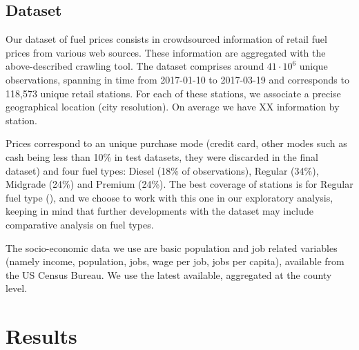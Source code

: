 \documentclass[3p,times,procedia]{elsarticle}
\begin{document}
\subsection{Dataset}


Our dataset of fuel prices consists in crowdsourced information of retail fuel prices from various web sources. These information are aggregated with the above-described crawling tool. The dataset comprises around $41\cdot 10^6$ unique observations, spanning in time from 2017-01-10 to 2017-03-19 and corresponds to 118,573 unique retail stations. For each of these stations, we associate a precise geographical location (city resolution). On average we have XX information by station. 



Prices correspond to an unique purchase mode (credit card, other modes such as cash being less than 10\% in test datasets, they were discarded in the final dataset) and four fuel types: Diesel (18\% of observations), Regular (34\%), Midgrade (24\%) and Premium (24\%). The best coverage of stations is for Regular fuel type (), and we choose to work with this one in our exploratory analysis, keeping in mind that further developments with the dataset may include comparative analysis on fuel types.




The socio-economic data we use are basic population and job related variables (namely income, population, jobs, wage per job, jobs per capita), available from the US Census Bureau. We use the latest available, aggregated at the county level.



\section{Results} \label{sec:result}
\end{document}
